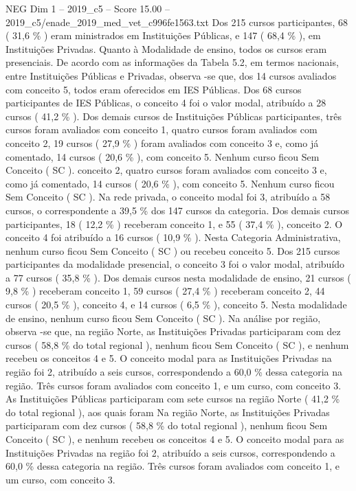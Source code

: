 \begin{textsample}{NEG Dim 1 – 2019\_c5 – Score 15.00 – 2019\_c5/enade\_2019\_med\_vet\_c996fe1563.txt}
Dos 215 cursos participantes, 68 ( 31,6 \% ) eram ministrados em Instituições Públicas, e 147 ( 68,4 \% ), em Instituições Privadas.
Quanto à Modalidade de ensino, todos os cursos eram presenciais.
De acordo com as informações da Tabela 5.2, em termos nacionais, entre Instituições Públicas e Privadas, observa -se que, dos 14 cursos avaliados com conceito 5, todos eram oferecidos em IES Públicas.
Dos 68 cursos participantes de IES Públicas, o conceito 4 foi o valor modal, atribuído a 28 cursos ( 41,2 \% ).
Dos demais cursos de Instituições Públicas participantes, três cursos foram avaliados com conceito 1, quatro cursos foram avaliados com conceito 2, 19 cursos ( 27,9 \% ) foram avaliados com conceito 3 e, como já comentado, 14 cursos ( 20,6 \% ), com conceito 5.
Nenhum curso ficou Sem Conceito ( SC ). conceito 2, quatro cursos foram avaliados com conceito 3 e, como já comentado, 14 cursos ( 20,6 \% ), com conceito 5.
Nenhum curso ficou Sem Conceito ( SC ).
Na rede privada, o conceito modal foi 3, atribuído a 58 cursos, o correspondente a 39,5 \% dos 147 cursos da categoria.
Dos demais cursos participantes, 18 ( 12,2 \% ) receberam conceito 1, e 55 ( 37,4 \% ), conceito 2.
O conceito 4 foi atribuído a 16 cursos ( 10,9 \% ).
Nesta Categoria Administrativa, nenhum curso ficou Sem Conceito ( SC ) ou recebeu conceito 5.
Dos 215 cursos participantes da modalidade presencial, o conceito 3 foi o valor modal, atribuído a 77 cursos ( 35,8 \% ).
Dos demais cursos nesta modalidade de ensino, 21 cursos ( 9,8 \% ) receberam conceito 1, 59 cursos ( 27,4 \% ) receberam conceito 2, 44 cursos ( 20,5 \% ), conceito 4, e 14 cursos ( 6,5 \% ), conceito 5.
Nesta modalidade de ensino, nenhum curso ficou Sem Conceito ( SC ).
Na análise por região, observa -se que, na região Norte, as Instituições Privadas participaram com dez cursos ( 58,8 \% do total regional ), nenhum ficou Sem Conceito ( SC ), e nenhum recebeu os conceitos 4 e 5.
O conceito modal para as Instituições Privadas na região foi 2, atribuído a seis cursos, correspondendo a 60,0 \% dessa categoria na região.
Três cursos foram avaliados com conceito 1, e um curso, com conceito 3.
As Instituições Públicas participaram com sete cursos na região Norte ( 41,2 \% do total regional ), aos quais foram Na região Norte, as Instituições Privadas participaram com dez cursos ( 58,8 \% do total regional ), nenhum ficou Sem Conceito ( SC ), e nenhum recebeu os conceitos 4 e 5.
O conceito modal para as Instituições Privadas na região foi 2, atribuído a seis cursos, correspondendo a 60,0 \% dessa categoria na região.
Três cursos foram avaliados com conceito 1, e um curso, com conceito 3.

\end{textsample}
